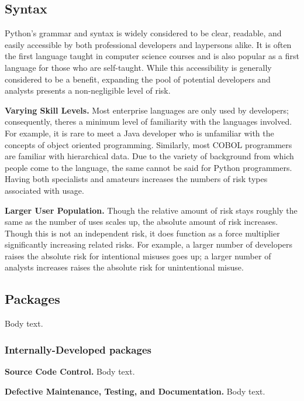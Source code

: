         \subsection{Syntax}

            Python's grammar and syntax is widely considered to be clear, readable, and easily accessible by both professional developers and laypersons alike. It is often the first language taught in computer science courses and is also popular as a first language for those who are self-taught. While this accessibility is generally considered to be a benefit, expanding the pool of potential developers and analysts presents a non-negligible level of risk. 

            \textbf{Varying Skill Levels.}
            Most enterprise languages are only used by developers; consequently, theres a minimum level of familiarity with the languages involved. For example, it is rare to meet a Java developer who is unfamiliar with the concepts of object oriented programming. Similarly, most COBOL programmers are familiar with hierarchical data. Due to the variety of background from which people come to the language, the same cannot be said for Python programmers. Having both specialists and amateurs increases the numbers of risk types associated with usage.

            \textbf{Larger User Population.}
            Though the relative amount of risk stays roughly the same as the number of uses scales up, the absolute amount of risk increases. Though this is not an independent risk, it does function as a force multiplier significantly increasing related risks. For example, a larger number of developers raises the absolute risk for intentional misuses goes up; a larger number of analysts increases raises the absolute risk for unintentional misuse.
 
        \subsection{Packages}

            Body text.

            \subsubsection{Internally-Developed packages}

                \textbf{Source Code Control.}
                Body text.

                \textbf{Defective Maintenance, Testing, and Documentation.}
                Body text.

